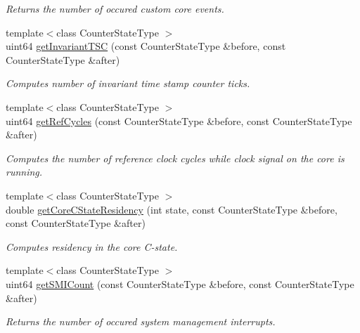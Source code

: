\begin{DoxyCompactItemize}
\begin{DoxyCompactList}\small\item\em Returns the number of occured custom core events. \end{DoxyCompactList}\item 
{\footnotesize template$<$class Counter\+State\+Type $>$ }\\uint64 \mbox{\hyperlink{class_basic_counter_state_a45cf07a8d3ce2c48968842554a3854f9}{get\+Invariant\+T\+SC}} (const Counter\+State\+Type \&before, const Counter\+State\+Type \&after)
\begin{DoxyCompactList}\small\item\em Computes number of invariant time stamp counter ticks. \end{DoxyCompactList}\item 
{\footnotesize template$<$class Counter\+State\+Type $>$ }\\uint64 \mbox{\hyperlink{class_basic_counter_state_aaa3691b803702deec828d0d8d8a8f326}{get\+Ref\+Cycles}} (const Counter\+State\+Type \&before, const Counter\+State\+Type \&after)
\begin{DoxyCompactList}\small\item\em Computes the number of reference clock cycles while clock signal on the core is running. \end{DoxyCompactList}\item 
{\footnotesize template$<$class Counter\+State\+Type $>$ }\\double \mbox{\hyperlink{class_basic_counter_state_a98aa8d4eb21e8a992fc181d65018e5ce}{get\+Core\+C\+State\+Residency}} (int state, const Counter\+State\+Type \&before, const Counter\+State\+Type \&after)
\begin{DoxyCompactList}\small\item\em Computes residency in the core C-\/state. \end{DoxyCompactList}\item 
{\footnotesize template$<$class Counter\+State\+Type $>$ }\\uint64 \mbox{\hyperlink{class_basic_counter_state_a5e245473e2297272a50ca054b33c8c86}{get\+S\+M\+I\+Count}} (const Counter\+State\+Type \&before, const Counter\+State\+Type \&after)
\begin{DoxyCompactList}\small\item\em Returns the number of occured system management interrupts. \end{DoxyCompactList}\end{DoxyCompactItemize}



